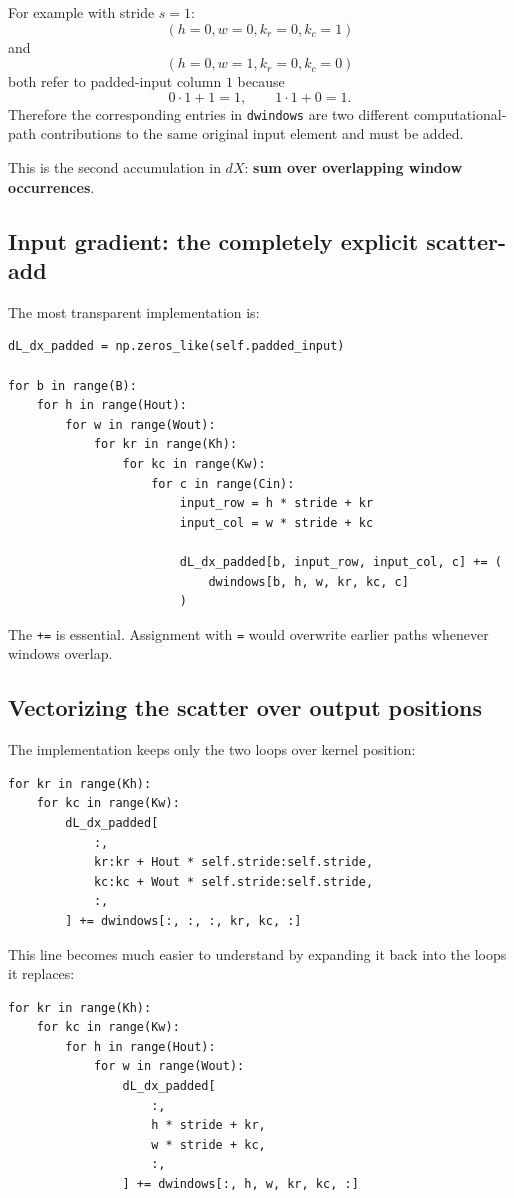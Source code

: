 \documentclass[11pt,a4paper]{article}
\newcommand{\code}[1]{\texttt{#1}}
\begin{document}
For example with stride $s=1$:
\[
(h=0,w=0,k_r=0,k_c=1)
\]
and
\[
(h=0,w=1,k_r=0,k_c=0)
\]
both refer to padded-input column $1$ because
\[
0\cdot1+1=1,
\qquad
1\cdot1+0=1.
\]
Therefore the corresponding entries in \code{dwindows} are two different computational-path contributions to the same original input element and must be added.

This is the second accumulation in $dX$: \textbf{sum over overlapping window occurrences}.

\subsection{Input gradient: the completely explicit scatter-add}

The most transparent implementation is:
\begin{lstlisting}
dL_dx_padded = np.zeros_like(self.padded_input)

for b in range(B):
    for h in range(Hout):
        for w in range(Wout):
            for kr in range(Kh):
                for kc in range(Kw):
                    for c in range(Cin):
                        input_row = h * stride + kr
                        input_col = w * stride + kc

                        dL_dx_padded[b, input_row, input_col, c] += (
                            dwindows[b, h, w, kr, kc, c]
                        )
\end{lstlisting}

The \code{+=} is essential. Assignment with \code{=} would overwrite earlier paths whenever windows overlap.

\subsection{Vectorizing the scatter over output positions}

The implementation keeps only the two loops over kernel position:
\begin{lstlisting}
for kr in range(Kh):
    for kc in range(Kw):
        dL_dx_padded[
            :,
            kr:kr + Hout * self.stride:self.stride,
            kc:kc + Wout * self.stride:self.stride,
            :,
        ] += dwindows[:, :, :, kr, kc, :]
\end{lstlisting}

This line becomes much easier to understand by expanding it back into the loops it replaces:
\begin{lstlisting}
for kr in range(Kh):
    for kc in range(Kw):
        for h in range(Hout):
            for w in range(Wout):
                dL_dx_padded[
                    :,
                    h * stride + kr,
                    w * stride + kc,
                    :,
                ] += dwindows[:, h, w, kr, kc, :]
\end{lstlisting}
\end{document}
